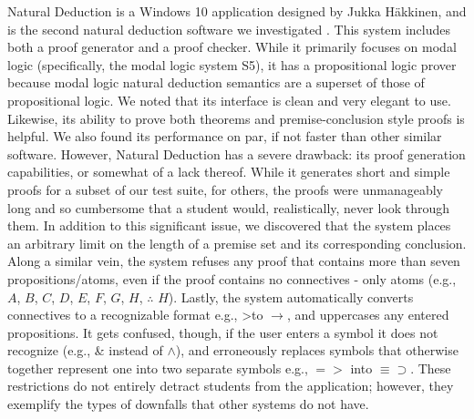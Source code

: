 \documentclass[ms]{uncgdissertationexp2}
\theoremstyle{plain}
\theoremstyle{definition}
\theoremstyle{remark}
\begin{document}
Natural Deduction is a Windows 10 application designed by Jukka H\"akkinen, and is the second natural deduction software we investigated \cite{naturaldeduction}. This system includes both a proof generator and a proof checker. While it primarily focuses on modal logic (specifically, the modal logic system S5), it has a propositional logic prover because modal logic natural deduction semantics are a superset of those of propositional logic. We noted that its interface is clean and very elegant to use. Likewise, its ability to prove both theorems and premise-conclusion style proofs is helpful. We also found its performance on par, if not faster than other similar software. However, Natural Deduction has a severe drawback: its proof generation capabilities, or somewhat of a lack thereof. While it generates short and simple proofs for a subset of our test suite, for others, the proofs were unmanageably long and so cumbersome that a student would, realistically, never look through them. In addition to this significant issue, we discovered that the system places an arbitrary limit on the length of a premise set and its corresponding conclusion. Along a similar vein, the system refuses any proof that contains more than seven propositions/atoms, even if the proof contains no connectives - only atoms (e.g., $A$, $B$, $C$, $D$, $E$, $F$, $G$, $H$, $\therefore$ $H$). Lastly, the system automatically converts connectives to a recognizable format e.g., \textgreater\;to $\to$, and uppercases any entered propositions. It gets confused, though, if the user enters a symbol it does not recognize (e.g., \& instead of $\land$), and erroneously replaces symbols that otherwise together represent one into two separate symbols e.g., $=>$ into $\equiv\supset$. These restrictions do not entirely detract students from the application; however, they exemplify the types of downfalls that other systems do not have.
\end{document}
